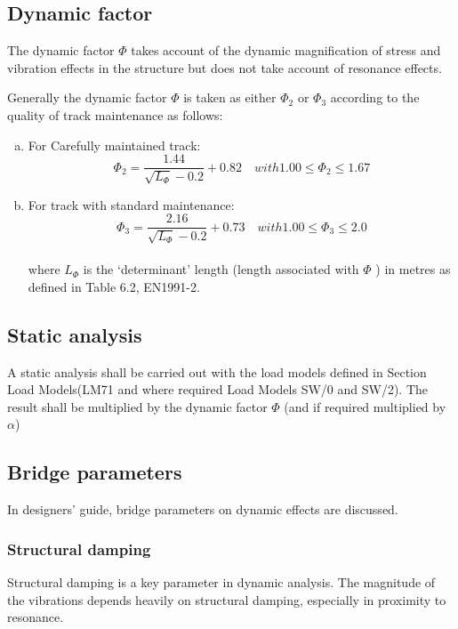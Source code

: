 \subsection{Dynamic factor}\label{sec:dynamicfactor}
The dynamic factor $ \Phi $ takes account of the dynamic magnification of stress and vibration effects in the structure but does not take account of resonance effects.

Generally the dynamic factor $ \varPhi $ is taken as either $ \varPhi_2 $ or $ \varPhi_3 $ according to the quality of track maintenance as follows:

\begin{enumerate}[(a)]
	\item For Carefully maintained track: 
		\begin{equation}
			\varPhi_2=\dfrac{1.44}{\sqrt{L_\varPhi}-0.2}+0.82 \quad with1.00\leq \varPhi_2\leq 1.67
		\end{equation}
	\item For track with standard maintenance:
		\begin{equation}
			\varPhi_3=\dfrac{2.16}{\sqrt{L_\varPhi}-0.2}+0.73 \quad with 1.00\leq \varPhi_3\leq 2.0
		\end{equation}\\
	where $ L_\varPhi $ is the `determinant' length (length associated with $ \varPhi $ ) in metres as defined in Table 6.2, EN1991-2\cite{EC12}.
\end{enumerate}

\subsection{Static analysis}
A static analysis shall be carried out with the load models defined in Section Load Models(LM71 and where required Load Models SW/0 and SW/2). The result shall be multiplied by the dynamic factor $ \Phi $ (and if required multiplied by $ \alpha $)

\subsection{Bridge parameters}
In designers' guide\cite{calgaro2010designers}, bridge parameters on dynamic effects are discussed.

\subsubsection{Structural damping}
Structural damping is a key parameter in dynamic analysis. The magnitude of the vibrations depends heavily on structural damping, especially in proximity to resonance.

